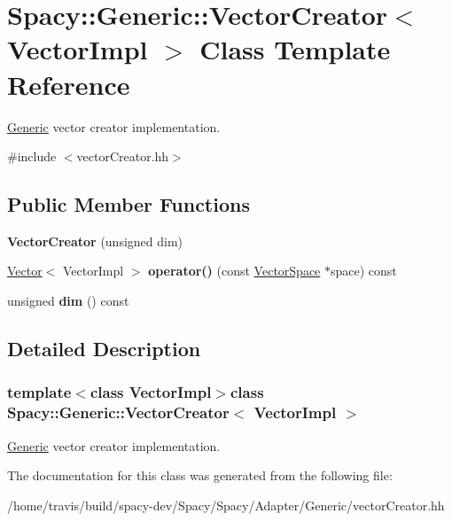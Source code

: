 \hypertarget{classSpacy_1_1Generic_1_1VectorCreator}{\section{\-Spacy\-:\-:\-Generic\-:\-:\-Vector\-Creator$<$ \-Vector\-Impl $>$ \-Class \-Template \-Reference}
\label{classSpacy_1_1Generic_1_1VectorCreator}
}


\hyperlink{namespaceSpacy_1_1Generic}{\-Generic} vector creator implementation.  




{\ttfamily \#include $<$vector\-Creator.\-hh$>$}

\subsection*{\-Public \-Member \-Functions}
\begin{DoxyCompactItemize}
\item 
\hypertarget{classSpacy_1_1Generic_1_1VectorCreator_a19fcd1bd6edb602294cf1c1eedc64c55}{{\bfseries \-Vector\-Creator} (unsigned dim)}\label{classSpacy_1_1Generic_1_1VectorCreator_a19fcd1bd6edb602294cf1c1eedc64c55}

\item 
\hypertarget{classSpacy_1_1Generic_1_1VectorCreator_ad394c7a64f4270c89e13af1f75649ad9}{\hyperlink{classSpacy_1_1Generic_1_1Vector}{\-Vector}$<$ \-Vector\-Impl $>$ {\bfseries operator()} (const \hyperlink{classSpacy_1_1VectorSpace}{\-Vector\-Space} $\ast$space) const }\label{classSpacy_1_1Generic_1_1VectorCreator_ad394c7a64f4270c89e13af1f75649ad9}

\item 
\hypertarget{classSpacy_1_1Generic_1_1VectorCreator_a1f1e7616f7319b511655873eed442088}{unsigned {\bfseries dim} () const }\label{classSpacy_1_1Generic_1_1VectorCreator_a1f1e7616f7319b511655873eed442088}

\end{DoxyCompactItemize}


\subsection{\-Detailed \-Description}
\subsubsection*{template$<$class Vector\-Impl$>$class Spacy\-::\-Generic\-::\-Vector\-Creator$<$ Vector\-Impl $>$}

\hyperlink{namespaceSpacy_1_1Generic}{\-Generic} vector creator implementation. 

\-The documentation for this class was generated from the following file\-:\begin{DoxyCompactItemize}
\item 
/home/travis/build/spacy-\/dev/\-Spacy/\-Spacy/\-Adapter/\-Generic/vector\-Creator.\-hh\end{DoxyCompactItemize}
